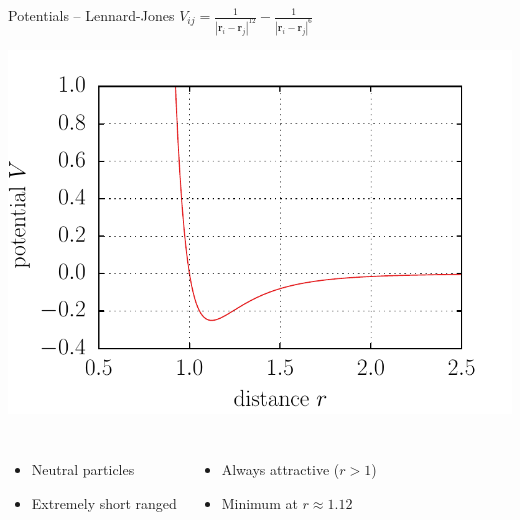 \documentclass[mathserif,serif]{beamer}
\begin{document}
\begin{frame}{Potentials -- Lennard-Jones}
	\centering
	$V_{ij} = \frac{1}{| \mathbf{r}_i - \mathbf{r}_j |^{12}} - \frac{1}{| \mathbf{r}_i - \mathbf{r}_j |^6}$
	
	
	\includegraphics[height=0.5\textheight]{./figures/potential_lennard_jones.pdf}
	\begin{columns}
			\begin{itemize}
				\item Neutral particles
				\item Extremely short ranged
			\end{itemize}
			\begin{itemize}
				\item Always attractive ($r > 1$)
				\item Minimum at $r\approx 1.12$
			\end{itemize}
	\end{columns}
	
\end{frame}

\end{document}
